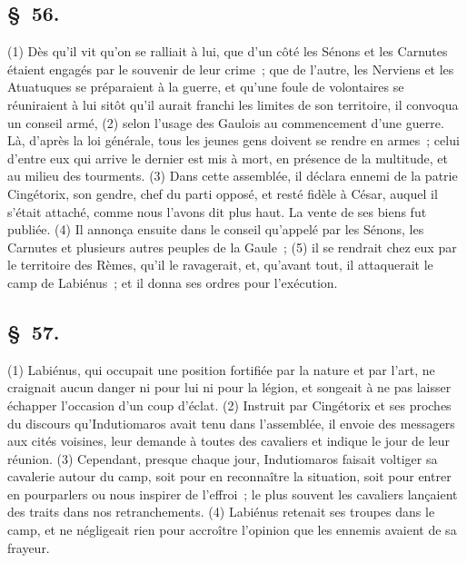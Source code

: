 \documentclass[french,twoside]{book} %
\begin{document}
\subsection[{§ 56.}]{ \textsc{§ 56.} }
\noindent (1) Dès qu’il vit qu’on se ralliait à lui, que d’un côté les Sénons et les Carnutes étaient engagés par le souvenir de leur crime ; que de l’autre, les Nerviens et les Atuatuques se préparaient à la guerre, et qu’une foule de volontaires se réuniraient à lui sitôt qu’il aurait franchi les limites de son territoire, il convoqua un conseil armé, (2) selon l’usage des Gaulois au commencement d’une guerre. Là, d’après la loi générale, tous les jeunes gens doivent se rendre en armes ; celui d’entre eux qui arrive le dernier est mis à mort, en présence de la multitude, et au milieu des tourments. (3) Dans cette assemblée, il déclara ennemi de la patrie Cingétorix, son gendre, chef du parti opposé, et resté fidèle à César, auquel il s’était attaché, comme nous l’avons dit plus haut. La vente de ses biens fut publiée. (4) Il annonça ensuite dans le conseil qu’appelé par les Sénons, les Carnutes et plusieurs autres peuples de la Gaule ; (5) il se rendrait chez eux par le territoire des Rèmes, qu’il le ravagerait, et, qu’avant tout, il attaquerait le camp de Labiénus ; et il donna ses ordres pour l’exécution.
\subsection[{§ 57.}]{ \textsc{§ 57.} }
\noindent (1) Labiénus, qui occupait une position fortifiée par la nature et par l’art, ne craignait aucun danger ni pour lui ni pour la légion, et songeait à ne pas laisser échapper l’occasion d’un coup d’éclat. (2) Instruit par Cingétorix et ses proches du discours qu’Indutiomaros avait tenu dans l’assemblée, il envoie des messagers aux cités voisines, leur demande à toutes des cavaliers et indique le jour de leur réunion. (3) Cependant, presque chaque jour, Indutiomaros faisait voltiger sa cavalerie autour du camp, soit pour en reconnaître la situation, soit pour entrer en pourparlers ou nous inspirer de l’effroi ; le plus souvent les cavaliers lançaient des traits dans nos retranchements. (4) Labiénus retenait ses troupes dans le camp, et ne négligeait rien pour accroître l’opinion que les ennemis avaient de sa frayeur.
\end{document}
